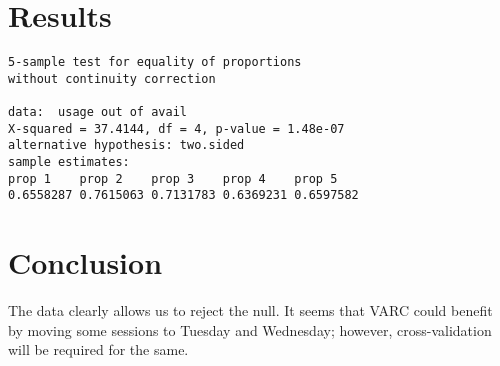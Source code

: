 \documentclass[twocolumn]{article}
\begin{document}
\section{Results}
\vspace{-1.25em}
\begin{lstlisting}
5-sample test for equality of proportions
without continuity correction

data:  usage out of avail
X-squared = 37.4144, df = 4, p-value = 1.48e-07
alternative hypothesis: two.sided
sample estimates:
prop 1    prop 2    prop 3    prop 4    prop 5 
0.6558287 0.7615063 0.7131783 0.6369231 0.6597582 
\end{lstlisting}

\section{Conclusion}
The data clearly allows us to reject the null. It seems that VARC could benefit by moving some sessions to Tuesday and Wednesday; however, cross-validation will be required for the same.
\end{document}
